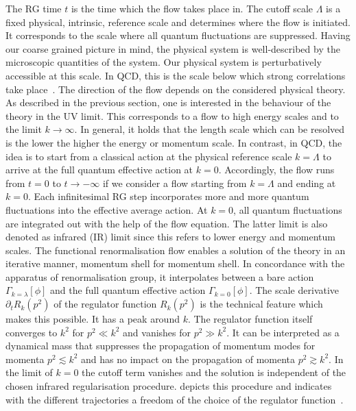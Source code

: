 \documentclass[paper=a4,11pt,bibliography=totoc]{scrartcl}
\begin{document}
The RG time $t$ is the time which the flow takes place in. The cutoff scale $\Lambda$ is a fixed physical, intrinsic, reference scale and determines where the flow is initiated. It corresponds to the scale where all quantum fluctuations are suppressed. Having our coarse grained picture in mind, the physical system is well-described by the microscopic quantities of the system. Our physical system is perturbatively accessible at this scale. In QCD, this is the scale below which strong correlations take place~\cite{Pawlowski2018}. The direction of the flow depends on the considered physical theory. As described in the previous section, one is interested in the behaviour of the theory in the UV limit. This corresponds to a flow to high energy scales and to the limit $k\to\infty$. In general, it holds that the length scale which can be resolved is the lower the higher the energy or momentum scale. In contrast, in QCD, the idea is to start from a classical action at the physical reference scale $k=\Lambda$ to arrive at the full quantum effective action at $k=0$. Accordingly, the flow runs from $t=0$ to $t\to-\infty$ if we consider a flow starting from $k=\Lambda$ and ending at $k=0$. Each infinitesimal RG step incorporates more and more quantum fluctuations into the effective average action. At $k=0$, all quantum fluctuations are integrated out with the help of the flow equation. The latter limit is also denoted as infrared (IR) limit since this refers to lower energy and momentum scales. The functional renormalisation flow enables a solution of the theory in an iterative manner, momentum shell for momentum shell. In concordance with the apparatus of renormalisation group, it interpolates between a bare action $\Gamma_{k=\lambda}[\phi]$ and the full quantum effective action $\Gamma_{k=0}[\phi]$. The scale derivative $\partial_t R_k(p^2)$ of the regulator function $R_k(p^2)$ is the technical feature which makes this possible. It has a peak around $k$. The regulator function itself converges to $k^2$ for $p^2 \ll k^2$ and vanishes for $p^2 \gg k^2$. It can be interpreted as a dynamical mass that suppresses the propagation of momentum modes for momenta $p^2\lesssim k^2$ and has no impact on the propagation of momenta $p^2 \gtrsim k^2$. In the limit of $k=0$ the cutoff term vanishes and the solution is independent of the chosen infrared regularisation procedure.  depicts this procedure and indicates with the different trajectories a freedom of the choice of the regulator function~\cite{Pawlowski2018}.
\end{document}
